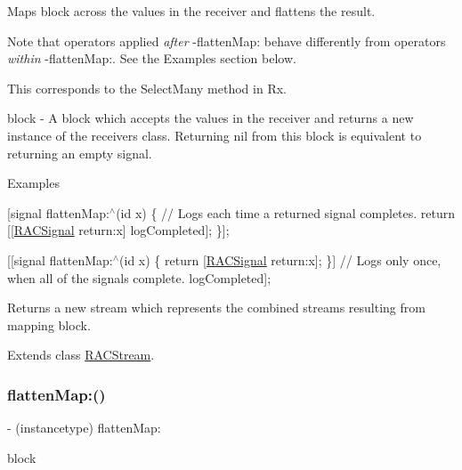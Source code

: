Maps {\ttfamily block} across the values in the receiver and flattens the result.

Note that operators applied {\itshape after} -\/flatten\+Map\+: behave differently from operators {\itshape within} -\/flatten\+Map\+:. See the Examples section below.

This corresponds to the {\ttfamily Select\+Many} method in Rx.

block -\/ A block which accepts the values in the receiver and returns a new instance of the receiver\textquotesingle{}s class. Returning {\ttfamily nil} from this block is equivalent to returning an empty signal.

Examples

\mbox{[}signal flatten\+Map\+:$^\wedge$(id x) \{ // Logs each time a returned signal completes. return \mbox{[}\mbox{[}\mbox{\hyperlink{interface_r_a_c_signal}{R\+A\+C\+Signal}} return\+:x\mbox{]} log\+Completed\mbox{]}; \}\mbox{]};

\mbox{[}\mbox{[}signal flatten\+Map\+:$^\wedge$(id x) \{ return \mbox{[}\mbox{\hyperlink{interface_r_a_c_signal}{R\+A\+C\+Signal}} return\+:x\mbox{]}; \}\mbox{]} // Logs only once, when all of the signals complete. log\+Completed\mbox{]};

Returns a new stream which represents the combined streams resulting from mapping {\ttfamily block}. 

Extends class \mbox{\hyperlink{interface_r_a_c_stream_a2441b0306adc6ae2845219f8b116119a}{R\+A\+C\+Stream}}.

\mbox{\label{category_r_a_c_stream_07_operations_08_a2441b0306adc6ae2845219f8b116119a}} 
\subsubsection{\texorpdfstring{flatten\+Map\+:()}{flattenMap:()}\hspace{0.1cm}{\footnotesize\ttfamily [3/3]}}
{\footnotesize\ttfamily -\/ (instancetype) flatten\+Map\+: \begin{DoxyParamCaption}\item[{(\mbox{\hyperlink{interface_r_a_c_stream}{R\+A\+C\+Stream}} $\ast$($^\wedge$)(id value))}]{block }\end{DoxyParamCaption}}

